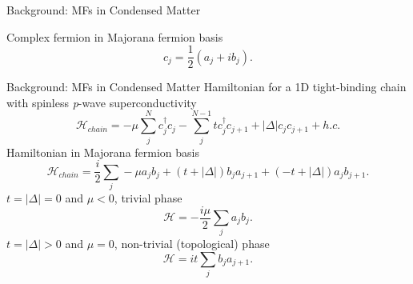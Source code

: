 \documentclass[xcolor=dvipsnames,10pt,aspectratio=169]{beamer}
\newcommand{\ham}{\mathcal{H}}
\newcommand{\cc}{c^{\dagger}}
\newcommand{\de}{\Delta}
\newcommand{\BD}{Background}
\begin{document}
  \begin{frame}{\BD: MFs in Condensed Matter}

    \vspace{20pt}
    Complex fermion in Majorana fermion basis
    \begin{equation}
      c_j = \dfrac{1}{2}(a_j + i b_j).
    \end{equation}

  \end{frame}

  \begin{frame}{\BD: MFs in Condensed Matter}
    Hamiltonian for a 1D tight-binding chain with spinless \textit{p}-wave superconductivity
    \begin{equation}
      \ham_{chain} = -\mu\sum_j^N \cc_j c_j -\sum_j^{N-1} t \cc_j c_{j+1} + |\de| c_j c_{j+1} + h.c.
    \end{equation}
    Hamiltonian in Majorana fermion basis
    \begin{equation}
      \ham_{chain} = \dfrac{i}{2} \sum_j -\mu a_j b_j + (t+|\de|) b_j a_{j+1} + (-t+|\de|) a_j b_{j+1}.
    \end{equation}
    $t=|\de|=0$ and $\mu<0$, trivial phase
    \begin{equation}
      \ham = -\dfrac{i\mu}{2} \sum_j a_j b_j.
    \end{equation}
    $t=|\de|>0$ and $\mu=0$, non-trivial (topological) phase
    \begin{equation}
      \ham = it \sum_j b_j a_{j+1}.
    \end{equation}

  \end{frame}
\end{document}
